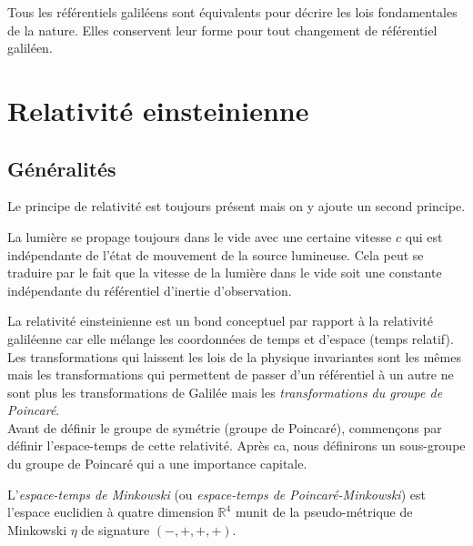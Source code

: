 \documentclass[a4paper,11pt]{report}
\begin{document}
        \begin{prin}[de relativité]
        \begin{leftbar}
            Tous les référentiels galiléens sont équivalents pour décrire les lois fondamentales de la nature. Elles conservent leur forme pour tout changement de référentiel galiléen.
        \end{leftbar}
        \end{prin}
    
    \section{Relativité einsteinienne}
    
        \subsection{Généralités}
    
            Le principe de relativité est toujours présent mais on y ajoute un second principe.
            
            \begin{prin}
            \begin{leftbar}
                La lumière se propage toujours dans le vide avec une certaine vitesse $c$ qui est indépendante de l'état de mouvement de la source lumineuse. Cela peut se traduire par le fait que la vitesse de la lumière dans le vide soit une constante indépendante du référentiel d'inertie d'observation.
            \end{leftbar}
            \end{prin}
            
            La relativité einsteinienne est un bond conceptuel par rapport à la relativité galiléenne car elle mélange les coordonnées de temps et d'espace (temps relatif). Les transformations qui laissent les lois de la physique invariantes sont les mêmes mais les transformations qui permettent de passer d'un référentiel à un autre ne sont plus les transformations de Galilée mais les \textit{transformations du groupe de Poincaré}.\\
            
            Avant de définir le groupe de symétrie (groupe de Poincaré), commençons par définir l'espace-temps de cette relativité. Après ca, nous définirons un sous-groupe du groupe de Poincaré qui a une importance capitale.
            
            \begin{definition}
                L'\textit{espace-temps de Minkowski} (ou \textit{espace-temps de Poincaré-Minkowski}) est l'espace euclidien à quatre dimension $\mathbb{R}^4$ munit de la pseudo-métrique de Minkowski $\eta$ de signature $(-,+,+,+)$.
            \end{definition}
            
\end{document}
